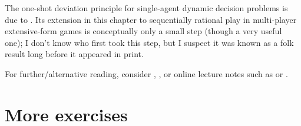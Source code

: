 The one-shot deviation principle for single-agent dynamic decision problems is due to \textcite{Blackwell1965}. Its extension in this chapter to sequentially rational play in multi-player extensive-form games is conceptually only a small step (though a very useful one); I don't know who first took this step, but I suspect it was known as a folk result long before it appeared in print.

For further/alternative reading, consider \textcite[section~4.2]{FudenbergTirole1991book}, \textcite[Exercise~227.1]{OsborneRubinstein1994}, or online lecture notes such as \textcite{Ray2005} or \textcite{Manea2016}.



\section{More exercises}
\label{osdp:exer}

